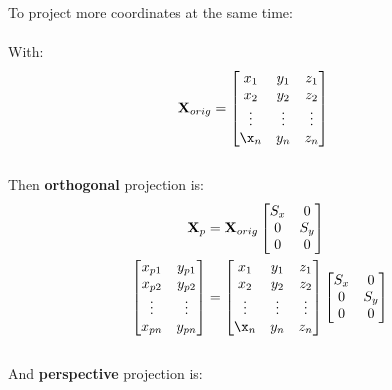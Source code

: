 \documentclass[10pt,b5paper,titlepage]{book}
\begin{document}
To project more coordinates at the same time: \\
\\
With:
\begin{eqnarray}
    \begin{split}
        \mathbf{X}_{orig} &=
        \begin{bmatrix}
            x_1 & y_1 & z_1 \\
            x_2 & y_2 & z_2 \\
            \vdots & \vdots & \vdots \\
            \x_n & y_n & z_n
        \end{bmatrix}
    \end{split}
\end{eqnarray}
\\
Then \textbf{orthogonal} projection is:
\begin{eqnarray}
    \begin{split}
        \mathbf{X}_p &= \mathbf{X}_{orig}
        \begin{bmatrix}
            S_x & 0 \\
            0 & S_y \\
            0 & 0
        \end{bmatrix} \\
        \begin{bmatrix}
            x_{p1} & y_{p1} \\
            x_{p2} & y_{p2} \\
            \vdots & \vdots \\
            x_{pn} & y_{pn}
        \end{bmatrix}
        &=
        \begin{bmatrix}
            x_1 & y_1 & z_1 \\
            x_2 & y_2 & z_2 \\
            \vdots & \vdots & \vdots \\
            \x_n & y_n & z_n
        \end{bmatrix}
        \begin{bmatrix}
            S_x & 0 \\
            0 & S_y \\
            0 & 0
        \end{bmatrix}
    \end{split}
\end{eqnarray}
\\
And \textbf{perspective} projection is:
\end{document}
